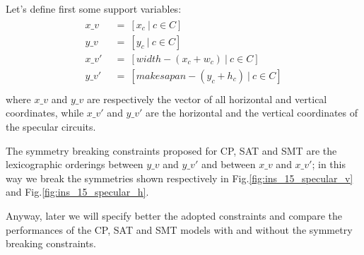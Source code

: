         Let's define first some support variables:
        \begin{align}
            \label{eq:specular_coord}
            \begin{split}
                x\_v\   &\ =\ [x_c\ |\ c \in C]                     \\
                y\_v\   &\ =\ [y_c\ |\ c \in C]                     \\
                x\_v'\  &\ =\ [width - (x_c + w_c)\ |\ c \in C]     \\
                y\_v'\  &\ =\ [makesapan - (y_c + h_c)\ |\ c \in C] \\                
            \end{split} 
        \end{align}
        where $x\_v$ and $y\_v$ are respectively the vector of all horizontal and vertical coordinates,
        while $x\_v'$ and $y\_v'$ are the horizontal and the vertical coordinates of the specular circuits.

        The symmetry breaking constraints proposed for CP, SAT and SMT are the lexicographic orderings
        between $y\_v$ and $y\_v'$ and between $x\_v$ and $x\_v'$; in this way we break the 
        symmetries shown respectively in Fig.\ref{fig:ins_15_specular_v} and Fig.\ref{fig:ins_15_specular_h}.


        Anyway, later we will specify better the adopted constraints and compare the performances of the 
        CP, SAT and SMT models with and without the symmetry breaking constraints.

